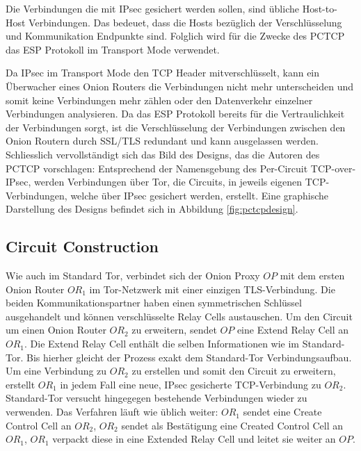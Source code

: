 \documentclass[fleqn,envcountsame,runningheads,10pt,a4paper]{llncs}
\begin{document}
Die Verbindungen die mit IPsec gesichert werden sollen, sind übliche 
Host-to-Host Verbindungen. Das bedeuet, dass die Hosts bezüglich der 
Verschlüsselung und Kommunikation Endpunkte sind. Folglich wird für die Zwecke 
des PCTCP das ESP Protokoll im Transport Mode verwendet.

Da IPsec im Transport Mode den TCP Header mitverschlüsselt, kann ein Überwacher 
eines Onion Routers die Verbindungen nicht mehr unterscheiden und somit keine 
Verbindungen mehr zählen oder den Datenverkehr einzelner Verbindungen 
analysieren. Da das ESP Protokoll bereits für die Vertraulichkeit der 
Verbindungen sorgt, ist die Verschlüsselung der Verbindungen zwischen den Onion 
Routern durch SSL/TLS redundant und kann ausgelassen werden. Schliesslich 
vervollständigt sich das Bild des Designs, das die Autoren des PCTCP 
vorschlagen: Entsprechend der Namensgebung des Per-Circuit TCP-over-IPsec, 
werden Verbindungen über Tor, die Circuits, in jeweils eigenen TCP-Verbindungen, 
welche über IPsec gesichert werden, erstellt. Eine graphische Darstellung des 
Designs befindet sich in Abbildung \ref{fig:pctcpdesign}.

\subsection{Circuit Construction}

Wie auch im Standard Tor, verbindet sich der Onion Proxy $\textit{OP}$ mit dem 
ersten Onion Router $\textit{OR}_1$ im Tor-Netzwerk mit einer einzigen 
TLS-Verbindung. Die beiden Kommunikationspartner haben einen symmetrischen 
Schlüssel ausgehandelt und können verschlüsselte Relay Cells austauschen. Um den 
Circuit um einen Onion Router $\textit{OR}_2$ zu erweitern, sendet $\textit{OP}$ 
eine Extend Relay Cell an $\textit{OR}_1$. Die Extend Relay Cell enthält die 
selben Informationen wie im Standard-Tor. Bis hierher gleicht der Prozess exakt 
dem Standard-Tor Verbindungsaufbau. Um eine Verbindung zu $\textit{OR}_2$ zu 
erstellen und somit den Circuit zu erweitern, erstellt $\textit{OR}_1$ in jedem 
Fall eine neue, IPsec gesicherte TCP-Verbindung zu $\textit{OR}_2$. Standard-Tor 
versucht hingegegen bestehende Verbindungen wieder zu verwenden. Das Verfahren 
läuft wie üblich weiter: $\textit{OR}_1$ sendet eine Create Control Cell an 
$\textit{OR}_2$, $\textit{OR}_2$ sendet als Bestätigung eine Created Control 
Cell an $\textit{OR}_1$, $\textit{OR}_1$ verpackt diese in eine Extended Relay 
Cell und leitet sie weiter an $\textit{OP}$.
\end{document}
